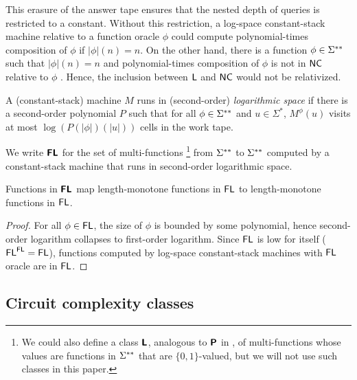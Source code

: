 \documentclass[envcountsame,orivec,oribibl]{llncs}
\begin{document}
This erasure of the answer tape
ensures that the nested depth of queries is restricted to a constant.
Without this restriction, a log-space constant-stack machine relative to 
a function oracle $\phi$ could compute polynomial-times composition
of $\phi$ if $|\phi|(n) = n$.
On the other hand, there is a function $\phi \in \Sigma ^{**}$ such that $|\phi|(n) = n$
and polynomial-times composition of $\phi$ is not in $\mathsf{NC}$ relative to $\phi$ \cite{aehlig2007relativizing}.
Hence, the inclusion between $\mathsf{L}$ and $\mathsf{NC}$ would not be relativized.



\begin{definition}
 A (constant-stack) machine $M$ runs in (second-order) \emph{logarithmic space}
 if there is a second-order polynomial $P$ such that for all $\phi \in \Sigma ^{**}$
 and $u \in \Sigma^*$, $M^\phi(u)$ visits at most $\log(P(|\phi|)(|u|))$ cells
 in the work tape.
\end{definition}

\begin{definition}
 We write $\text{\bfseries \sffamily \upshape FL}$ for the set of multi-functions%
\footnote{%
We could also define a class $\text{\bfseries \sffamily \upshape L}$, 
analogous to $\text{\bfseries \sffamily \upshape P}$ in \cite{kawamura2012complexity}, 
of multi-functions whose values are functions in $\Sigma ^{**}$ 
that are $\{0, 1\}$-valued, 
but we will not use such classes in this paper. 
}
 from $\Sigma ^{**}$ to $\Sigma ^{**}$ 
 computed by a constant-stack machine that runs in second-order logarithmic space.
\end{definition}

\begin{lemma}
\label{lemma:Ltwo-maps-L-to-L}
 Functions in $\text{\bfseries \sffamily \upshape FL}$ map 
 length-monotone functions in $\mathsf{FL}$
 to length-monotone functions in $\mathsf{FL}$.
\end{lemma}

\begin{proof}
For all $\phi \in \mathsf{FL}$, the size of $\phi$ is bounded by some polynomial,
hence second-order logarithm collapses to first-order logarithm.
Since $\mathsf{FL}$ is low for itself ($\mathsf{FL}^{\mathsf{FL}} = \mathsf{FL}$), 
functions computed by log-space constant-stack machines with $\mathsf{FL}$ oracle are in $\mathsf{FL}$.
\end{proof}


\subsection{Circuit complexity classes}
\end{document}
